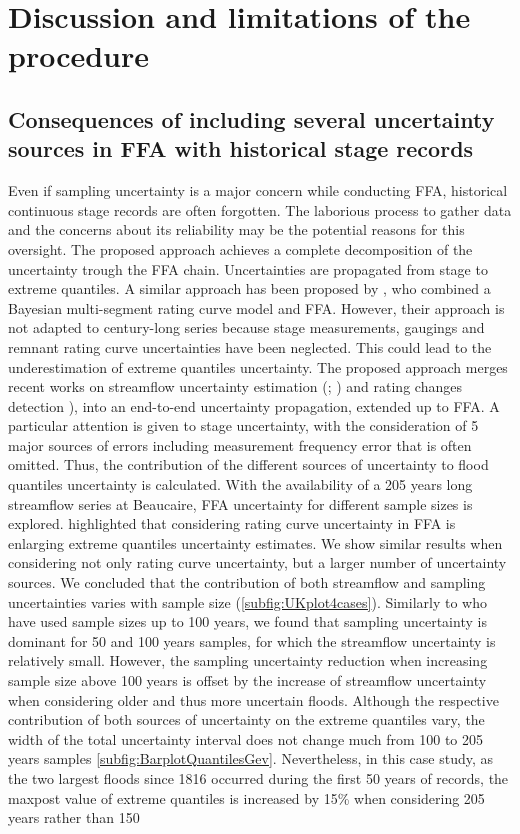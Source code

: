 \documentclass[11pt]{article}
\begin{document}
\section{Discussion and limitations of the procedure}

    \subsection{Consequences of including several uncertainty sources in FFA with historical stage records}

    Even if sampling uncertainty is a major concern while conducting FFA, historical continuous stage records are often forgotten. The laborious process to gather data and the concerns about its reliability may be the potential reasons for this oversight. The proposed approach achieves a complete decomposition of the uncertainty trough the FFA chain. Uncertainties are propagated from stage to extreme quantiles. A similar approach has been proposed by \citet{steinbakk_propagation_2016}, who combined a Bayesian multi-segment rating curve model and FFA. However, their approach is not adapted to century-long series because stage measurements, gaugings and remnant rating curve uncertainties have been neglected. This could lead to the underestimation of extreme quantiles uncertainty. The proposed approach merges recent works on streamflow uncertainty estimation (\citet{horner_impact_2018}; \citet{mansanarez_shift_2019}) and rating changes detection \citep{darienzo_detection_2021}), into an end-to-end uncertainty propagation, extended up to FFA. A particular attention is given to stage uncertainty, with the consideration of 5 major sources of errors including measurement frequency error that is often omitted. Thus, the contribution of the different sources of uncertainty to flood quantiles uncertainty is calculated. With the availability of a 205 years long streamflow series at Beaucaire, FFA uncertainty for different sample sizes is explored. \citet{petersen-overleir_accounting_2009} highlighted that considering rating curve uncertainty in FFA is enlarging extreme quantiles uncertainty estimates. We show similar results when considering not only rating curve uncertainty, but a larger number of uncertainty sources. We concluded that the contribution of both streamflow and sampling uncertainties varies with sample size (\ref{subfig:UKplot4cases}). Similarly to \citet{steinbakk_propagation_2016} who have used sample sizes up to 100 years, we found that sampling uncertainty is dominant for 50 and 100 years samples, for which the streamflow uncertainty is relatively small. However, the sampling uncertainty reduction when increasing sample size above 100 years is offset by the increase of streamflow uncertainty when considering older and thus more uncertain floods. Although the respective contribution of both sources of uncertainty on the extreme quantiles vary, the width of the total uncertainty interval does not change much from 100 to 205 years samples \ref{subfig:BarplotQuantilesGev}. Nevertheless, in this case study, as the two largest floods since 1816 occurred during the first 50 years of records, the maxpost value of extreme quantiles is increased by 15\% when considering 205 years rather than 150 
\end{document}
